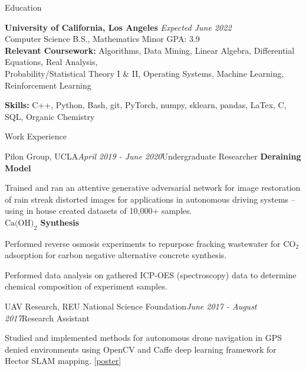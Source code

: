 \documentclass{resume}
\begin{document}
\begin{rSection}{Education}

{\bf University of California, Los Angeles} \hfill {\em Expected June 2022} 
\\ Computer Science B.S., Mathematics Minor \hfill {GPA: 3.9}\\
{\bf Relevant Coursework:} Algorithms, Data Mining, Linear Algebra, Differential Equations, Real Analysis,\\ Probability/Statistical Theory I \& II,
Operating Systems, Machine Learning, Reinforcement Learning
\end{rSection}

{\bf Skills:} C++, Python, Bash, git, PyTorch, numpy, sklearn, pandas, LaTex, C, SQL, Organic Chemistry


\begin{rSection}{Work Experience}
    \begin{rSubsection}{Pilon Group, UCLA}{\em April 2019 - June 2020}{Undergraduate Researcher}{}
        {\bf Deraining Model}
        \item Trained and ran an attentive generative adversarial network for image restoration of rain streak distorted
        images for applications in autonomous driving systems – using in house created datasets of 10,000+ samples.\\
        {\bf $\text{Ca}\text{(OH)}_{2}$ Synthesis}
        \item Performed reverse osmosis experiments to repurpose fracking wastewater for $\text{CO}_2$ adsorption 
        for carbon negative alternative concrete synthesis.
        \item Performed data analysis on gathered ICP-OES (spectroscopy) data to determine chemical composition of experiment samples.
    \end{rSubsection}
    \begin{rSubsection}{UAV Research, REU National Science Foundation}{\em June 2017 - August 2017}{Research Assistant}{}
        \item Studied and implemented methods for autonomous drone navigation in GPS denied environments using OpenCV and Caffe deep learning framework for Hector SLAM mapping.
        [\href{https://docs.google.com/presentation/d/1fp-MPZUgKS_PhMD90d4aL0Rh0-YfghnEYHb3sHKmnGE/edit?usp=sharing}{poster}]
    \end{rSubsection}
\end{rSection}
\end{document}

